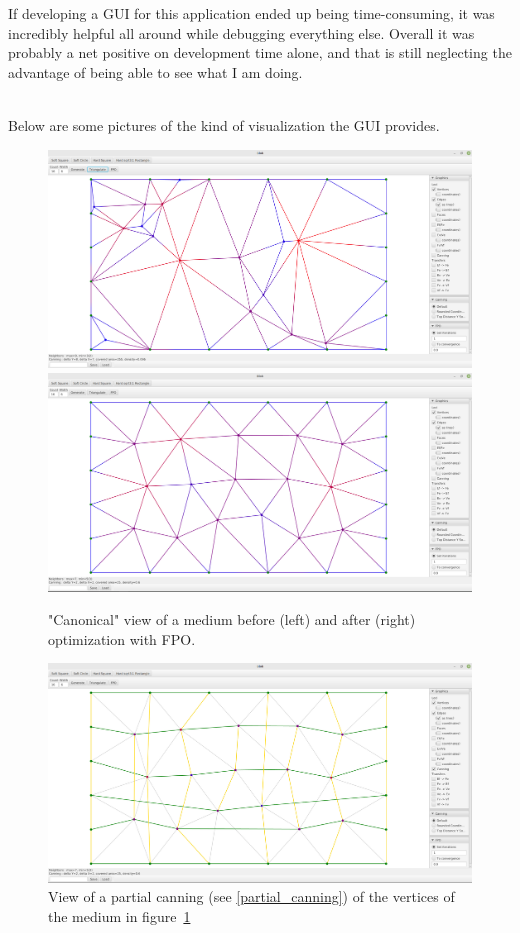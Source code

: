 \documentclass{article}
\begin{document}
If developing a GUI for this application ended up being time-consuming, it was incredibly helpful all around while debugging everything else. Overall it was probably a net positive on development time alone, and that is still neglecting the advantage of being able to see what I am doing.\\
$ $

Below are some pictures of the kind of visualization the GUI provides.

\begin{figure}[h]
	\centering\includegraphics[width=0.45\linewidth]{assets/canonical_before.png}
	\centering\includegraphics[width=0.45\linewidth]{assets/canonical_after.png}
	\caption{"Canonical" view of a medium before (left) and after (right) optimization with FPO.}
	\label{fig:gui_before_after_FPO}
\end{figure}

\begin{figure}[h]
	\centering\includegraphics[width=0.8\linewidth]{assets/canning_view.png}
	\caption{View of a partial canning (see \ref{partial_canning}) of the vertices of the medium in figure~\ref{fig:gui_before_after_FPO}}
	\label{fig:gui_canning}
\end{figure}
\end{document}
